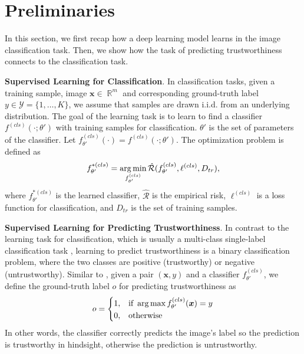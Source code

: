 \section{Preliminaries}

In this section, we first recap how a deep learning model learns in the image classification task. Then, we show how the task of predicting trustworthiness connects to the classification task.

\noindent\textbf{Supervised Learning for Classification}. In classification tasks, given a training sample, \ie image $\bm{x} \in \mathop{\mathbb{R}}^{m}$ and corresponding ground-truth label $y \in \mathcal{Y}=\{1,\ldots,K\}$, we assume that samples are drawn i.i.d. from an underlying distribution.  The goal of the learning task is to learn to find a classifier $f^{(cls)}(\cdot; \theta')$ with training samples for classification. $\theta'$ is the set of parameters of the classifier. Let $f^{(cls)}_{\theta'}(\cdot) = f^{(cls)}(\cdot; \theta')$. The optimization problem is defined as
\begin{align}
	f^{*(cls)}_{\theta'} = \operatorname*{arg\,min}_{f^{(cls)}_{\theta'}} \hat{\mathcal{R}}(f^{(cls)}_{\theta'}, \ell^{(cls)}, D_{tr}),
\label{eqn:risk}
\end{align}
where $f^{*(cls)}_{\theta'}$ is the learned classifier, $\hat{\mathcal{R}}$ is the empirical risk, $\ell^{(cls)}$ is a loss function for classification, and $D_{tr}$ is the set of training samples. 

\noindent\textbf{Supervised Learning for Predicting Trustworthiness}. In contrast to the learning task for classification, which is usually a multi-class single-label classification task \cite{Krizhevsky_NIPS_2012,He_CVPR_2016,Tan_ICML_2019,Dosovitskiy_ICLR_2021}, learning to predict trustworthiness is a binary classification problem, where the two classes are positive (\ie trustworthy) or negative (\ie untrustworthy). Similar to \cite{Corbiere_NIPS_2019}, given a pair $(\bm{x},y)$ and a classifier $f^{(cls)}_{\theta'}$, we define the ground-truth label $o$ for predicting trustworthiness as
\begin{align}
o = 
\begin{dcases}
    1, & \text{if } \operatorname*{arg\,max} f^{(cls)}_{\theta'}(\bm{x}) = y \\
    0, & \text{otherwise}
\end{dcases}
\label{eqn:def_trustworthy}
\end{align}
In other words, the classifier correctly predicts the image's label so the prediction is trustworthy in hindsight, otherwise the prediction is untrustworthy.


